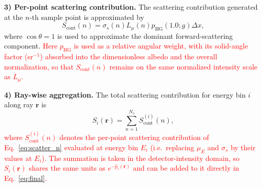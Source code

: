 \documentclass[journal]{IEEEtran}
\newcommand{\vr}{\mathbf{r}}
\newcommand{\new}[1]{\textcolor{red}{#1}}  %
\begin{document}
\textbf{3) Per-point scattering contribution.}
The scattering contribution generated at the $n$-th sample point is approximated by
\begin{equation}\label{eq:scatter_n}
  S_{\text{cont}}(n)=\sigma_s(n)L_\mu(n)p_{\text{HG}}(1.0;g)\Delta x,
\end{equation}
where $\cos\theta=1$ is used to approximate the dominant forward-scattering component. \new{Here $p_{\text{HG}}$ is used as a relative angular weight, with its solid-angle factor (sr$^{-1}$) absorbed into the dimensionless albedo and the overall normalization, so that $S_{\text{cont}}(n)$ remains on the same normalized intensity scale as $L_\mu$.}

\textbf{4) Ray-wise aggregation.}
The total scattering contribution for energy bin $i$ along ray $\vr$ is
\begin{equation}\label{eq:scatter_total}
  S_i(\vr)=\sum_{n=1}^{N_s}S_{\text{cont}}^{(i)}(n),
\end{equation}
\new{where $S_{\text{cont}}^{(i)}(n)$ denotes the per-point scattering contribution of Eq.~\eqref{eq:scatter_n} evaluated at energy bin $E_i$ (i.e.\ replacing $\mu_E$ and $\sigma_s$ by their values at $E_i$). The summation is taken in the detector-intensity domain, so $S_i(\vr)$ shares the same units as $e^{-\hat{p}_i(\vr)}$ and can be added to it directly in Eq.~\eqref{eq:final}.}
\end{document}
